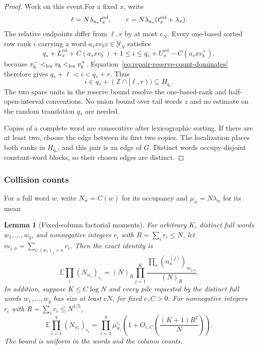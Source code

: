 \documentclass[11pt]{article}
\numberwithin{equation}{section}
\newtheorem{lemma}[theorem]{Lemma}
\theoremstyle{definition}
\theoremstyle{remark}
\newcommand{\E}{\mathbb E}
\newcommand{\1}{\mathbf 1}
\begin{document}
\begin{proof}
Work on this event.For a fixed \(x\), write
\[
 \ell=N\lambda_{a_s}t_x^{\rm rel},\qquad
 r=N\lambda_{a_s}(t_x^{\rm rel}+\lambda_x).
\]
The relative endpoints differ from \(\ell,r\) by at most
\(e_N\).  Every one-based sorted row rank \(i\) carrying a word
\(a_sxv_bz\in\mathcal Y_N\) satisfies
\[
 q_*+L_x^{\mathrm{rel}}+C(a_sxv_b^-)+1
 \le i\le
 q_*+U_x^{\mathrm{rel}}-C(a_sxv_b^+),
\]
because \(v_b^-<_{\rm lex}v_b<_{\rm lex}v_b^+\).
Equation~\eqref{eq:repair-reserve-count-dominates} therefore gives
\(q_*+\ell<i<q_*+r\).  Thus
\[
 i\in q_*+(\mathbb Z\cap[\ell,r))\subseteq H_{q_*}.
\]
The two spare units in the reserve bound resolve the one-based-rank
and half-open-interval conventions.  No union bound over tail words
\(z\) and no estimate on the random translation \(q_*\) are needed.

Copies of a complete word are consecutive after lexicographic sorting.
If there are at least two, choose the edge between its first two copies.
The localization places both ranks in \(H_{q_*}\), and this pair
is an edge of \(G\).  Distinct words occupy disjoint constant-word
blocks, so their chosen edges are distinct.
\end{proof}
\subsubsection{Collision counts}

For a full word $w$, write $N_w=C(w)$ for its occupancy and
$\mu_w=N\lambda_w$ for its mean.

\begin{lemma}[Fixed-column factorial moments]
\label{lem:fixed-column-factorial}
For arbitrary $K$, distinct full words $w_1,\ldots,w_q$, and nonnegative
integers $r_i$ with $R=\sum_i r_i\le N$, let $m_{j,a}=\sum_{i:(w_i)_j=a}r_i$.
Then the exact identity is
\[
 \E\prod_i(N_{w_i})_{r_i}
   =(N)_R\prod_{j=1}^K\frac{\prod_a(n_a^{(j)})_{m_{j,a}}}{(N)_R}.
\]
In addition, suppose $K\le C\log N$ and every pile requested by the distinct full words
$w_1,\ldots,w_q$ has size at least $cN$, for fixed $c,C>0$.
For nonnegative integers $r_i$ with $R=\sum_i r_i\le N^{1/5}$,
\begin{equation}
\label{eq:exact-fixed-column-factorials}
 \E\prod_{i=1}^q(N_{w_i})_{r_i}
 =\prod_{i=1}^q\mu_{w_i}^{r_i}
    \left(1+O_{c,C}\left(\frac{(K+1)R^2}{N}\right)\right).
\end{equation}
The bound is uniform in the words and the column counts.
\end{lemma}
\end{document}
